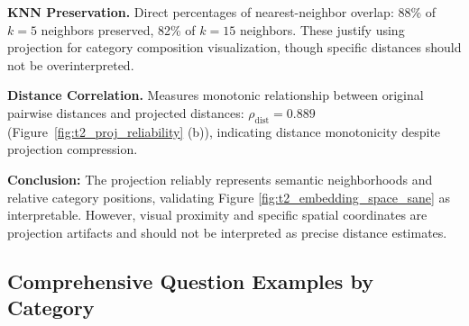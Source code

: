 \textbf{KNN Preservation.} Direct percentages of nearest-neighbor overlap: 88\% of $k=5$ neighbors preserved, 82\% of $k=15$ neighbors. These justify using projection for category composition visualization, though specific distances should not be overinterpreted.

\textbf{Distance Correlation.} Measures monotonic relationship between original pairwise distances and projected distances: $\rho_{\mathrm{dist}}=0.889$ (Figure~\ref{fig:t2_proj_reliability} (b)), indicating distance monotonicity despite projection compression.

\textbf{Conclusion:} The projection reliably represents semantic neighborhoods and relative category positions, validating Figure \ref{fig:t2_embedding_space_sane} as interpretable. However, visual proximity and specific spatial coordinates are projection artifacts and should not be interpreted as precise distance estimates.

\subsection{Comprehensive Question Examples by Category}
\label{sec:t2_examples}


